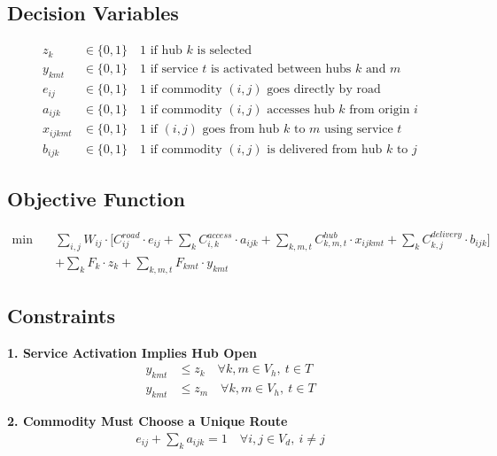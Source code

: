 \documentclass{article}
\begin{document}
\subsection*{Decision Variables}
\begin{align*}
z_k &\in \{0,1\} \quad \text{1 if hub } k \text{ is selected} \\
y_{kmt} &\in \{0,1\} \quad \text{1 if service } t \text{ is activated between hubs } k \text{ and } m \\
e_{ij} &\in \{0,1\} \quad \text{1 if commodity } (i,j) \text{ goes directly by road} \\
a_{ijk} &\in \{0,1\} \quad \text{1 if commodity } (i,j) \text{ accesses hub } k \text{ from origin } i \\
x_{ijkmt} &\in \{0,1\} \quad \text{1 if } (i,j) \text{ goes from hub } k \text{ to } m \text{ using service } t \\
b_{ijk} &\in \{0,1\} \quad \text{1 if commodity } (i,j) \text{ is delivered from hub } k \text{ to } j
\end{align*}

\subsection*{Objective Function}
\begin{align*}
\min \quad &\sum_{i,j} W_{ij} \cdot \bigg[
    C^{road}_{ij} \cdot e_{ij}
    + \sum_k C^{access}_{i,k} \cdot a_{ijk}
    + \sum_{k,m,t} C^{hub}_{k,m,t} \cdot x_{ijkmt}
    + \sum_k C^{delivery}_{k,j} \cdot b_{ijk}
\bigg] \\
&+ \sum_k F_k \cdot z_k
+ \sum_{k,m,t} F_{kmt} \cdot y_{kmt}
\end{align*}

\subsection*{Constraints}

\textbf{1. Service Activation Implies Hub Open}
\begin{align*}
y_{kmt} &\leq z_k \quad \forall k,m \in V_h,\ t \in T \\
y_{kmt} &\leq z_m \quad \forall k,m \in V_h,\ t \in T
\end{align*}

\textbf{2. Commodity Must Choose a Unique Route}
\begin{align*}
e_{ij} + \sum_k a_{ijk} = 1 \quad \forall i,j \in V_d,\ i \neq j
\end{align*}
\end{document}
